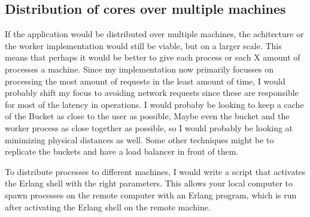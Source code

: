 \documentclass{article}
\begin{document}
\subsection{Distribution of cores over multiple machines}
If the application would be distributed over multiple machines, the achitecture
or the worker implementation would still be viable, but on a larger scale. This
means that perhaps it would be better to give each process or each X amount of
processes a machine. Since my implementation now primarily focusses on
processing the most amount of requests in the least amount of time, I would
probably shift my focus to avoiding network requests since these are responsible
for most of the
latency in operations. I would probaby be looking to keep a cache of the Bucket
as close to the user as possible, Maybe even the bucket and the worker process
as close together as possible, so I would probably be looking at minimizing physical
distances as well. Some other techniques might be to replicate the buckets and have a
load balancer in front of them. \par
To distribute processes to different machines, I would write a script that
activates the Erlang shell with the right parameters. This allows your local
computer to spawn processes on the remote computer with an Erlang program, which
is run after activating the Erlang shell on the remote machine.
\end{document}

